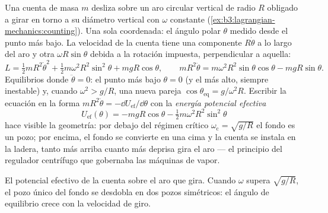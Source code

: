\begin{example}\label{ex:b3:lagrangian-mechanics:hoop}
Una cuenta de masa $m$ desliza sobre un aro circular vertical de radio $R$
obligado a girar en torno a su diámetro vertical con $\omega$ constante
(\cref{ex:b3:lagrangian-mechanics:counting}). Una sola coordenada: el ángulo
polar $\theta$ medido desde el punto más bajo. La velocidad de la cuenta
tiene una componente $R\dot\theta$ a lo largo del aro y otra
$\omega R\sin\theta$ debida a la rotación impuesta, perpendicular a aquella:
\[
L = \tfrac12 mR^2\dot\theta^2 + \tfrac12 m\omega^2R^2\sin^2\theta
 + mgR\cos\theta ,
\qquad
mR^2\ddot\theta = m\omega^2R^2\sin\theta\cos\theta - mgR\sin\theta .
\]
Equilibrios donde $\ddot\theta = 0$: el punto más bajo $\theta = 0$ (y el
más alto, siempre inestable) y, cuando $\omega^2 > g/R$, una nueva pareja
$\cos\theta_{\text{eq}} = g/\omega^2R$. Escribir la ecuación en la forma
$mR^2\ddot\theta = -\dd U_{\text{ef}}/\dd\theta$ con la \emph{energía
potencial efectiva}
\[
U_{\text{ef}}(\theta) = -mgR\cos\theta
 - \tfrac12 m\omega^2R^2\sin^2\theta
\]
hace visible la geometría: por debajo del régimen crítico
$\omega_{\text{c}} = \sqrt{g/R}$ el fondo es un pozo; por encima, el fondo
se convierte en una cima y la cuenta se instala en la ladera, tanto más
arriba cuanto más deprisa gira el aro --- el principio del regulador
centrífugo que gobernaba las máquinas de vapor.
\end{example}

\begin{omfigure}

{\small El potencial efectivo de la cuenta sobre el aro que gira. Cuando
$\omega$ supera $\sqrt{g/R}$, el pozo único del fondo se desdobla en dos
pozos simétricos: el ángulo de equilibrio crece con la velocidad de giro.}
\end{omfigure}

